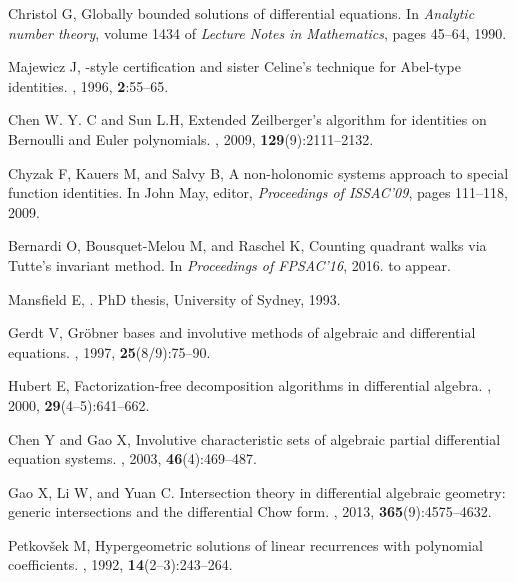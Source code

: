 \documentclass{jssc}
\begin{document}
\begin{thebibliography}{100}
Christol G,
\newblock Globally bounded solutions of differential equations.
\newblock In {\it Analytic number theory}, volume 1434 of {\it Lecture Notes in
  Mathematics}, pages 45--64, 1990.

Majewicz J,
-style certification and sister {C}eline's technique for
  {A}bel-type identities.
, 1996, {\bf 2}:55--65.

Chen W. Y. C and Sun L.H,
\newblock Extended {Z}eilberger's algorithm for identities on {B}ernoulli and
  {E}uler polynomials.
, 2009, {\bf 129}(9):2111--2132.

Chyzak F,  Kauers M, and  Salvy B,
\newblock A non-holonomic systems approach to special function identities.
\newblock In John May, editor, {\it Proceedings of ISSAC'09}, pages 111--118,
  2009.

 Bernardi O,  Bousquet-Melou M, and  Raschel K,
\newblock Counting quadrant walks via {T}utte's invariant method.
\newblock In {\it Proceedings of FPSAC'16}, 2016.
\newblock to appear.

 Mansfield E,
.
\newblock PhD thesis, University of Sydney, 1993.

 Gerdt V,
\newblock Gr{\"o}bner bases and involutive methods of algebraic and
  differential equations.
, 1997, {\bf 25}(8/9):75--90.

  Hubert E,
\newblock Factorization-free decomposition algorithms in differential algebra.
, 2000, {\bf  29}(4--5):641--662.

  Chen Y and  Gao X,
\newblock Involutive characteristic sets of algebraic partial differential
  equation systems.
, 2003, {\bf 46}(4):469--487.

  Gao X,  Li W, and  Yuan C.
\newblock Intersection theory in differential algebraic geometry: generic
  intersections and the differential {C}how form.
, 2013, {\bf 365}(9):4575--4632.

 Petkov{\v s}ek M,
\newblock Hypergeometric solutions of linear recurrences with polynomial
  coefficients.
, 1992, {\bf 14}(2--3):243--264.


\end{thebibliography}
\end{document}
